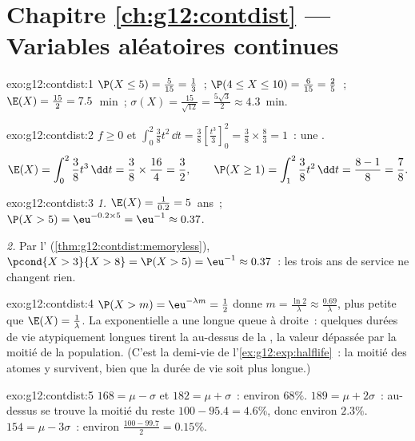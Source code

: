\section*{Chapitre \ref{ch:g12:contdist} --- Variables aléatoires continues}

\begin{solution}{exo:g12:contdist:1}
$\P(X \leq 5) = \frac{5}{15} = \frac13$~;
$\P(4 \leq X \leq 10) = \frac{6}{15} = \frac25$~;
$\E(X) = \frac{15}{2} = 7.5$~min~;
$\sigma(X) = \frac{15}{\sqrt{12}} = \frac{5\sqrt3}{2} \approx 4.3$~min.
\end{solution}

\begin{solution}{exo:g12:contdist:2}
$f \geq 0$ et
$\int_0^2 \frac38 t^2\,\dd t = \frac38\left[\frac{t^3}{3}\right]_0^2
= \frac38 \times \frac83 = 1$~: une .
\[
\E(X) = \int_0^2 \frac38 t^3\,\dd t = \frac38 \times \frac{16}{4} = \frac32,
\qquad
\P(X \geq 1) = \int_1^2 \frac38 t^2\,\dd t = \frac{8 - 1}{8} = \frac78 .
\]
\end{solution}

\begin{solution}{exo:g12:contdist:3}
\emph{1.} $\E(X) = \frac{1}{0.2} = 5$~ans~;
$\P(X > 5) = \eu^{-0.2\times5} = \eu^{-1} \approx 0.37$.

\emph{2.} Par l' (\cref{thm:g12:contdist:memoryless}),
$\pcond{X > 3}{X > 8} = \P(X > 5) = \eu^{-1} \approx 0.37$~: les trois ans
de service ne changent rien.
\end{solution}

\begin{solution}{exo:g12:contdist:4}
$\P(X > m) = \eu^{-\lambda m} = \frac12$ donne
$m = \frac{\ln 2}{\lambda} \approx \frac{0.69}{\lambda}$, plus petite que
$\E(X) = \frac1\lambda$. La  exponentielle a une longue queue à
droite~: quelques durées de vie atypiquement longues tirent la
\emph{} au-dessus de la \emph{}, la valeur dépassée par la
moitié de la population. (C'est la demi-vie de
l'\cref{ex:g12:exp:halflife}~: la moitié des atomes y survivent, bien que
la durée de vie  soit plus longue.)
\end{solution}

\begin{solution}{exo:g12:contdist:5}
$168 = \mu - \sigma$ et $182 = \mu + \sigma$~: environ $68\%$.
$189 = \mu + 2\sigma$~: au-dessus se trouve la moitié du reste
$100 - 95.4 = 4.6\%$, donc environ $2.3\%$.
$154 = \mu - 3\sigma$~: environ $\frac{100 - 99.7}{2} = 0.15\%$.
\end{solution}

